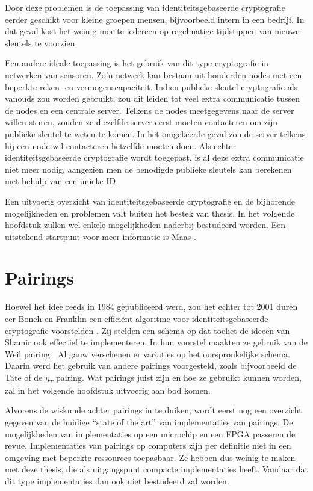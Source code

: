 Door deze problemen is de toepassing van identiteitsgebaseerde cryptografie eerder geschikt voor kleine groepen mensen, bijvoorbeeld intern in een bedrijf. In dat geval kost het weinig moeite iedereen op regelmatige tijdstippen van nieuwe sleutels te voorzien.

Een andere ideale toepassing is het gebruik van dit type cryptografie in netwerken van sensoren. Zo'n netwerk kan bestaan uit honderden nodes met een beperkte reken- en vermogenscapaciteit. Indien publieke sleutel cryptografie als vanouds zou worden gebruikt, zou dit leiden tot veel extra communicatie tussen de nodes en een centrale server. Telkens de nodes meetgegevens naar de server willen sturen, zouden ze diezelfde server eerst moeten contacteren om zijn publieke sleutel te weten te komen. In het omgekeerde geval zou de server telkens hij een node wil contacteren hetzelfde moeten doen.  Als echter identiteitsgebaseerde cryptografie wordt toegepast, is al deze extra communicatie niet meer nodig, aangezien men de benodigde publieke sleutels kan berekenen met behulp van een unieke ID.

Een uitvoerig overzicht van identiteitsgebaseerde cryptografie en de bijhorende mogelijkheden en problemen valt buiten het bestek van thesis. In het volgende hoofdstuk zullen wel enkele mogelijkheden naderbij bestudeerd worden. Een uitstekend startpunt voor meer informatie is Maas \cite{maas}.

\section{Pairings\label{inleiding-pairings}}

Hoewel het idee reeds in 1984 gepubliceerd werd, zou het echter tot 2001 duren eer Boneh en Franklin een effici\"ent algoritme voor identiteitsgebaseerde cryptografie voorstelden \cite{boneh}. Zij stelden een schema op dat toeliet de idee\"en van Shamir ook effectief te implementeren. In hun voorstel maakten ze gebruik van de Weil pairing \cite{weil}. Al gauw verschenen er variaties op het oorspronkelijke schema. Daarin werd het gebruik van andere pairings voorgesteld, zoals bijvoorbeeld de Tate \cite{tate} of de $\eta_T$ \cite{eta} pairing. Wat pairings juist zijn en hoe ze gebruikt kunnen worden, zal in het volgende hoofdstuk uitvoerig aan bod komen.

Alvorens de wiskunde achter pairings in te duiken, wordt eerst nog een overzicht gegeven van de huidige ``state of the art'' van implementaties van pairings. De mogelijkheden van implementaties op een microchip en een FPGA passeren de revue. Implementaties van pairings op computers zijn per definitie niet in een omgeving met beperkte ressources toepasbaar. Ze hebben dus weinig te maken met deze thesis, die als uitgangspunt compacte implementaties heeft. Vandaar dat dit type implementaties dan ook niet bestudeerd zal worden.

